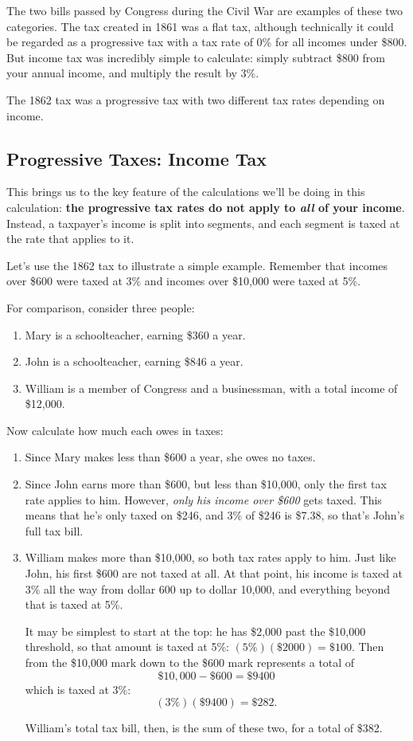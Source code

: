 The two bills passed by Congress during the Civil War are examples of these two categories.  The tax created in 1861 was a flat tax, although technically it could be regarded as a progressive tax with a tax rate of 0\% for all incomes under \$800.  But income tax was incredibly simple to calculate: simply subtract \$800 from your annual income, and multiply the result by 3\%.

The 1862 tax was a progressive tax with two different tax rates depending on income.

\subsection{Progressive Taxes: Income Tax}
This brings us to the key feature of the calculations we'll be doing in this calculation: \textbf{the progressive tax rates do not apply to \emph{all} of your income}.  Instead, a taxpayer's income is split into segments, and each segment is taxed at the rate that applies to it.

Let's use the 1862 tax to illustrate a simple example.  Remember that incomes over \$600 were taxed at 3\% and incomes over \$10,000 were taxed at 5\%.

For comparison, consider three people:
\begin{enumerate}
\item Mary is a schoolteacher, earning \$360 a year.
\item John is a schoolteacher, earning \$846 a year.
\item William is a member of Congress and a businessman, with a total income of \$12,000.
\end{enumerate}

Now calculate how much each owes in taxes:
\begin{enumerate}
\item Since Mary makes less than \$600 a year, she owes no taxes.
\item Since John earns more than \$600, but less than \$10,000, only the first tax rate applies to him.  However, \emph{only his income over \$600} gets taxed.  This means that he's only taxed on \$246, and 3\% of \$246 is \$7.38, so that's John's full tax bill.
\item William makes more than \$10,000, so both tax rates apply to him.  Just like John, his first \$600 are not taxed at all.  At that point, his income is taxed at 3\% all the way from dollar 600 up to dollar 10,000, and everything beyond that is taxed at 5\%.

It may be simplest to start at the top: he has \$2,000 past the \$10,000 threshold, so that amount is taxed at 5\%: $(5\%)(\$2000) = \$100$.  Then from the \$10,000 mark down to the \$600 mark represents a total of \[\$10,000 - \$600 = \$9400\] which is taxed at 3\%:
\[(3\%)(\$9400) = \$282.\]

William's total tax bill, then, is the sum of these two, for a total of \$382.
\end{enumerate}

